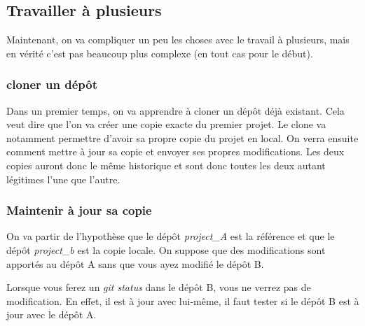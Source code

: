 \documentclass[12pt,a4paper]{article}
\begin{document}
\subsection{Travailler à plusieurs}

Maintenant, on va compliquer un peu les choses avec le travail à plusieurs, mais en vérité c'est pas beaucoup plus complexe (en tout cas pour le début).

\subsubsection{cloner un dépôt}
Dans un premier temps, on va apprendre à cloner un dépôt déjà existant. Cela veut dire que l'on va créer une copie exacte du premier projet. Le clone va notamment permettre d'avoir sa propre copie du projet en local. On verra ensuite comment mettre à jour sa copie et envoyer ses propres modifications. Les deux copies auront donc le même historique et sont donc toutes les deux autant légitimes l'une que l'autre.

{
}

\subsubsection{Maintenir à jour sa copie}

On va partir de l'hypothèse que le dépôt \emph{project\_A} est la référence et que le dépôt \emph{project\_b} est la copie locale. On suppose que des modifications sont apportés au dépôt A sans que vous ayez modifié le dépôt B.

Lorsque vous ferez un \emph{git status} dans le dépôt B, vous ne verrez pas de modification. En effet, il est à jour avec lui-même, il faut tester si le dépôt B est à jour avec le dépôt A.
\end{document}

